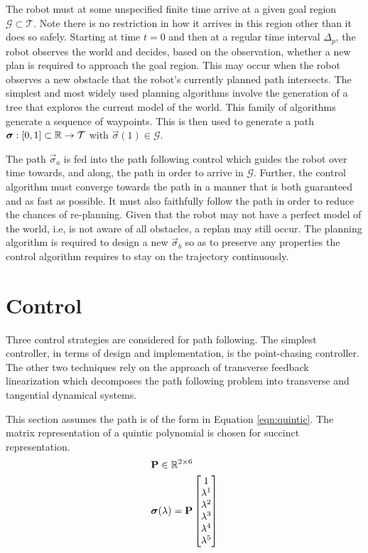\documentclass[oneside, 11pt]{book}
\begin{document}
The robot must at some unspecified finite time arrive at a given goal region $\mathcal{G}\subset\mathcal{T}$. Note there is no restriction in how it arrives in this region other than it does so safely. Starting at time $t=0$ and then at a regular time interval $\Delta_p$, the robot observes the world and decides, based on the observation, whether a new plan is required to approach the goal region. This may occur when the robot observes a new obstacle that the robot's currently planned path intersects. The simplest and most widely used planning algorithms involve the generation of a tree that explores the current model of the world. This family of algorithms generate a sequence of waypoints. This is then used to generate a path $\bm{\sigma}: [0,1]\subset\mathbb{R}\to\mathcal{T}$ with $\vec{\sigma}(1)\in\mathcal{G}$.

The path $\vec{\sigma}_a$ is fed into the path following control which guides the robot over time towards, and along, the path in order to arrive in $\mathcal{G}$. Further, the control algorithm must converge towards the path in a manner that is both guaranteed and as fast as possible. It must also faithfully follow the path in order to reduce the chances of re-planning. Given that the robot may not have a perfect model of the world, i.e, is not aware of all obstacles, a replan may still occur. The planning algorithm is required to design a new $\vec{\sigma}_b$ so as to preserve any properties the control algorithm requires to stay on the trajectory continuously.

\chapter{Control}\label{sec:control}
Three control strategies are considered for path following. The simplest controller, in terms of design and implementation, is the point-chasing controller. The other two techniques rely on the approach of transverse feedback linearization which decomposes the path following problem into transverse and tangential dynamical systems.

This section assumes the path is of the form in Equation \ref{eqn:quintic}. The matrix representation of a quintic polynomial is chosen for succinct representation.
\begin{align}
    &\mathbf{P}\in\mathbb{R}^{2\times6} \nonumber \\
    &\bm{\sigma}(\lambda) =    \mathbf{P}
                                \begin{bmatrix}
                                    1 \\
                                    \lambda^1 \\
                                    \lambda^2 \\
                                    \lambda^3 \\
                                    \lambda^4 \\
                                    \lambda^5
                                \end{bmatrix}
    \label{eqn:quintic}
\end{align}
\end{document}
